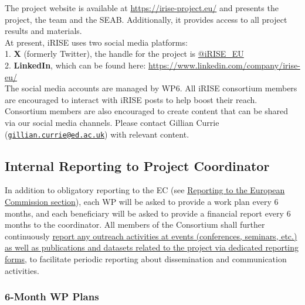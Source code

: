 \documentclass[
]{article}
\begin{document}
The project website is available at \url{https://irise-project.eu/} and presents the project, the team and the SEAB. Additionally, it provides access to all project results and materials.\\
At present, iRISE uses two social media platforms:\\
1. \textbf{X} (formerly Twitter), the handle for the project is \href{https://www.bing.com/ck/a?!\&\&p=aae49b8cd9d6708eJmltdHM9MTY5OTQ4ODAwMCZpZ3VpZD0yZjIzNzQ2Yy1hNzdkLTZiMjEtMDUyYi02NzYzYTYyNTZhYjEmaW5zaWQ9NTE3Nw\&ptn=3\&hsh=3\&fclid=2f23746c-a77d-6b21-052b-6763a6256ab1\&psq=\%40iRISE_EU+twitter\&u=a1aHR0cHM6Ly90d2l0dGVyLmNvbS9pUklTRV9FVQ\&ntb=1}{@iRISE\_EU}\\
2. \textbf{LinkedIn}, which can be found here: \url{https://www.linkedin.com/company/irise-eu/}\\
The social media accounts are managed by WP6. All iRISE consortium members are encouraged to interact with iRISE posts to help boost their reach. Consortium members are also encouraged to create content that can be shared via our social media channels. Please contact Gillian Currie (\href{mailto:gillian.currie@ed.ac.uk}{\nolinkurl{gillian.currie@ed.ac.uk}}) with relevant content.

\hypertarget{internal-reporting-to-project-coordinator}{%
\subsection{Internal Reporting to Project Coordinator}\label{internal-reporting-to-project-coordinator}}

In addition to obligatory reporting to the EC (see \protect\hyperlink{reporting-to-the-european-commission}{Reporting to the European Commission section}), each WP will be asked to provide a work plan every 6 months, and each beneficiary will be asked to provide a financial report every 6 months to the coordinator. All members of the Consortium shall further continuously \href{https://charitede.sharepoint.com/:x:/r/sites/iRISE/Shared\%20Documents/WP6/iRISE\%20Dissemination\%20Activity\%20Record.xlsx?d=w47a1cbfaa6c34ab5aee84a6dba643912\&csf=1\&web=1\&e=9cfBaW}{report any outreach activities at events (conferences, seminars, etc.) as well as publications and datasets related to the project via dedicated reporting forms}, to facilitate periodic reporting about dissemination and communication activities.

\hypertarget{month-wp-plans}{%
\subsubsection{6-Month WP Plans}\label{month-wp-plans}}
\end{document}
